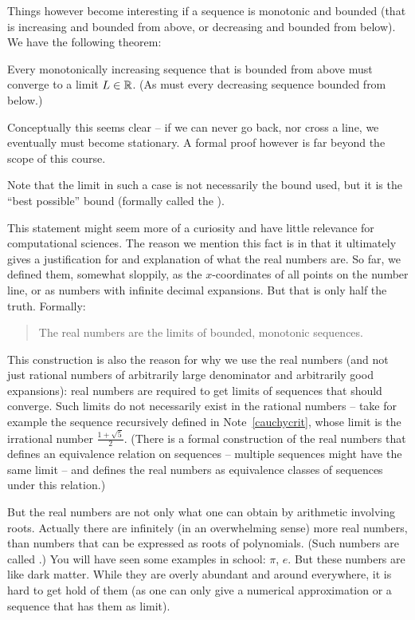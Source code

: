 Things however become interesting if a sequence is monotonic and bounded (that is
increasing and bounded from above, or decreasing and bounded from below). We have the
following theorem:
\begin{thm}
Every monotonically increasing sequence that is bounded from above must converge to a
limit $L\in{\mathbb R}$. (As must every decreasing sequence bounded from below.)
\end{thm}
Conceptually this seems clear -- if we can never go back, nor cross a line, we eventually
must become stationary. A formal proof however is far beyond the scope of this course.

Note that the limit in such a case is not necessarily the bound used, but it is the
``best possible'' bound (formally called the ).
\medskip

This statement might seem more of a curiosity and have little relevance for
computational sciences. The reason we mention this fact is in that it ultimately gives a
justification for and explanation of what the real numbers are. So far, we defined
them, somewhat sloppily, as the $x$-coordinates of all points on the number line, or as
numbers with infinite decimal expansions. But that is 
only half the truth. Formally:

\begin{quote}
The real numbers are the limits of bounded, monotonic sequences.
\end{quote}

This construction is also the reason for why we use the real numbers (and not
just rational numbers of arbitrarily large denominator and arbitrarily good
expansions): real numbers are required to get limits of sequences that should
converge. Such limits do not necessarily exist in the rational numbers --
take for example the sequence recursively defined in Note~\ref{cauchycrit},
whose limit is the irrational number $\frac{1+\sqrt{5}}{2}$.  (There is a
formal construction of the real numbers that defines an equivalence relation
on sequences -- multiple sequences might have the same limit -- and defines
the real numbers as equivalence classes of sequences under this relation.)

But the real numbers are not only what one can obtain by arithmetic involving
roots.  Actually there are infinitely (in an overwhelming sense) more real
numbers, than numbers that can be expressed as roots of polynomials. (Such
numbers are called .) You will have seen some examples
in school: $\pi$, $e$. But these numbers are like dark matter. While they are
overly abundant and around everywhere, it is hard to get hold of them (as one
can only give a numerical approximation or a sequence that has them as limit).
\smallskip

